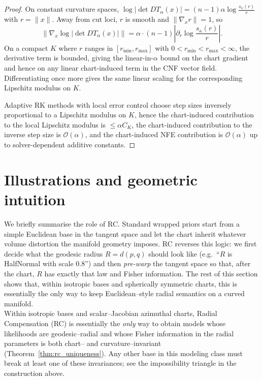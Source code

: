 \documentclass{article}
\theoremstyle{definition}
\theoremstyle{remark}
\begin{document}
\begin{proof}
On constant curvature spaces, $\log|\det DT_\alpha(x)|=(n-1)\alpha\log\frac{s_\kappa(r)}{r}$ with $r=\|x\|$.
Away from cut loci, $r$ is smooth and $\|\nabla_x r\|=1$, so
\[
\|\nabla_x\log|\det DT_\alpha(x)|\|
= \alpha\cdot (n-1)\left|\partial_r\log\frac{s_\kappa(r)}{r}\right|.
\]
On a compact $K$ where $r$ ranges in $[r_{\min},r_{\max}]$ with $0<r_{\min}<r_{\max}<\infty$,
the derivative term is bounded, giving the linear-in-$\alpha$ bound on the chart gradient and hence
on any linear chart-induced term in the CNF vector field. Differentiating once more gives the same
linear scaling for the corresponding Lipschitz modulus on $K$.

Adaptive RK methods with local error control choose step sizes inversely proportional to a Lipschitz
modulus on $K$, hence the chart-induced contribution to the local Lipschitz modulus is
$\leq\alpha C_K$, the chart-induced contribution to the inverse step size
is $\mathcal O(\alpha)$, and the chart-induced NFE contribution is
$\mathcal O(\alpha)$ up to solver-dependent additive constants.
\end{proof}


\section{Illustrations and geometric intuition}\label{app:rc_recap}



We briefly summarise the role of
RC. Standard wrapped priors start from a simple Euclidean base in the
tangent space and let the chart inherit whatever volume distortion the
manifold geometry imposes. RC reverses this logic: we first decide what
the geodesic radius $R = d(p,q)$ should look like (e.g.\ ``$R$ is
HalfNormal with scale $0.8$'') and then \emph{pre-warp} the tangent
space so that, after the chart, $R$ has exactly that law and Fisher
information. The rest of this section shows that, within isotropic
bases and spherically symmetric charts, this is essentially the only
way to keep Euclidean–style radial semantics on a curved manifold.\\

Within isotropic bases and scalar–Jacobian azimuthal charts, Radial Compensation
(RC) is essentially the \emph{only} way to obtain models whose likelihoods are
geodesic–radial and whose Fisher information in the radial parameters is both
chart– and curvature–invariant (Theorem~\ref{thm:rc_uniqueness}).
Any other base in this modeling class must break at least one of these
invariances; see the impossibility triangle in
the construction above.
\end{document}
